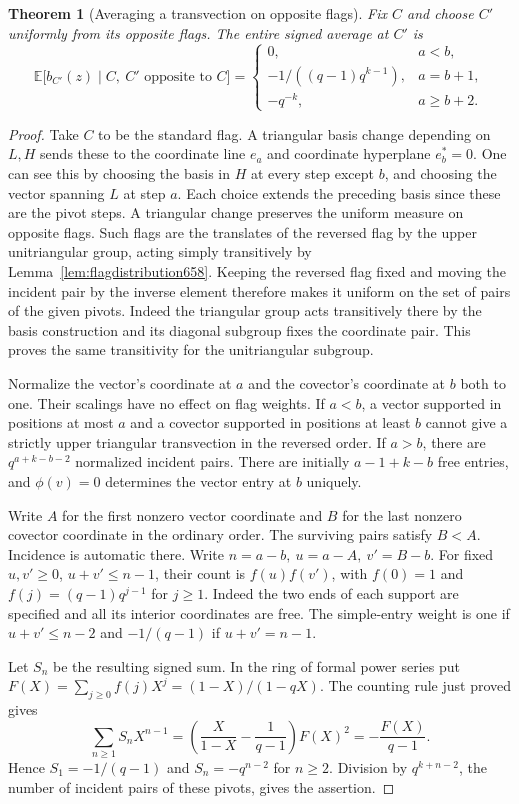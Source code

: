 \documentclass[a4paper,11pt]{article}
\newtheorem{theorem}[proposition]{Theorem}
\theoremstyle{definition}
\theoremstyle{remark}
\numberwithin{equation}{section}
\begin{document}
\begin{theorem}[Averaging a transvection on opposite flags]
\leavevmode\label{thm:oppositeaverage660}
Fix \(C\) and choose \(C'\) uniformly from its opposite flags.
The entire signed average at \(C'\) is
\[
 \mathbb E\big[b_{C'}(z)\mid C,\ C'\text{ opposite to }C\big]
    =\begin{cases}
      0,&a<b,\\[2pt]
      -1/((q-1)q^{k-1}),&a=b+1,\\[2pt]
      -q^{-k},&a\ge b+2 .
    \end{cases}
\]
\end{theorem}
\begin{proof}
Take \(C\) to be the standard flag. A triangular basis change
depending on \(L,H\) sends these to the coordinate line \(e_a\)
and coordinate hyperplane \(e_b^*=0\). One can see this by
choosing the basis in \(H\) at every step except \(b\), and
choosing the vector spanning \(L\) at step \(a\). Each choice
extends the preceding basis since these are the pivot steps.
A triangular change preserves the uniform measure on opposite
flags. Such flags are the translates of the reversed flag by
the upper unitriangular group, acting simply transitively by
Lemma~\ref{lem:flagdistribution658}. Keeping the reversed flag
fixed and moving the incident pair by the inverse element
therefore makes it uniform on the set of pairs of the given
pivots. Indeed the triangular group acts transitively there by
the basis construction and its diagonal subgroup fixes the
coordinate pair. This proves the same transitivity for the
unitriangular subgroup.

Normalize the vector's coordinate at \(a\) and the covector's
coordinate at \(b\) both to one. Their scalings have no effect
on flag weights. If \(a<b\), a vector supported in positions
at most \(a\) and a covector supported in positions at least
\(b\) cannot give a strictly upper triangular transvection in
the reversed order. If \(a>b\), there are \(q^{a+k-b-2}\)
normalized incident pairs. There are initially \(a-1+k-b\)
free entries, and \(\phi(v)=0\) determines the vector entry
at \(b\) uniquely.

Write \(A\) for the first nonzero vector coordinate and \(B\)
for the last nonzero covector coordinate in the ordinary order.
The surviving pairs satisfy \(B<A\). Incidence is automatic
there. Write \(n=a-b,\ u=a-A,\ v'=B-b\).
For fixed \(u,v'\ge0\), \(u+v'\le n-1\), their count is
\(f(u)f(v')\), with \(f(0)=1\) and \(f(j)=(q-1)q^{j-1}\)
for \(j\ge1\). Indeed the two ends of each support are
specified and all its interior coordinates are free. The
simple-entry weight is one if \(u+v'\le n-2\) and
\(-1/(q-1)\) if \(u+v'=n-1\).

Let \(S_n\) be the resulting signed sum. In the ring of formal
power series put \(F(X)=\sum_{j\ge0}f(j)X^j=(1-X)/(1-qX)\).
The counting rule just proved gives
\[
  \sum_{n\ge1}S_n X^{n-1}
    =\left(\frac{X}{1-X}-\frac1{q-1}\right)F(X)^2
    =-\frac{F(X)}{q-1}.
\]
Hence \(S_1=-1/(q-1)\) and \(S_n=-q^{n-2}\) for \(n\ge2\).
Division by \(q^{k+n-2}\), the number of incident pairs of
these pivots, gives the assertion.
\end{proof}
\end{document}
